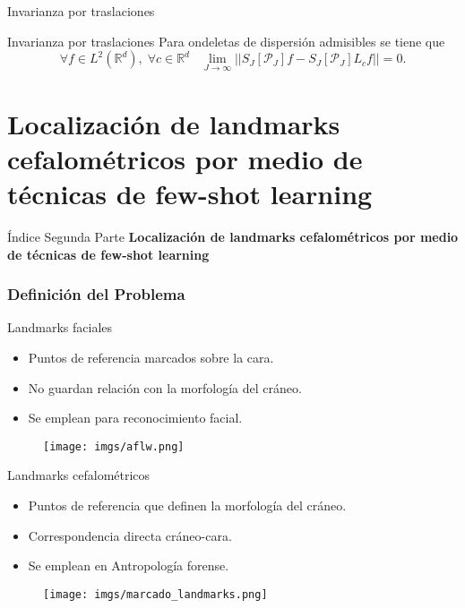 \documentclass[aspectratio=43]{beamer}
\begin{document}
\begin{frame}{Invarianza por traslaciones}
  \begin{alertblock}{Invarianza por traslaciones}
    Para ondeletas de dispersión admisibles se tiene que 
    $$\forall f \in L^2(\mathbb{R}^d), \; \forall c\in \mathbb{R}^d \;\;\; \lim_{J\rightarrow \infty}||S_J[\mathcal{P}_J] f-S_J[\mathcal{P}_J] L_cf||=0.$$
  \end{alertblock}
\end{frame}

\part{Localización de landmarks cefalométricos por medio de técnicas de few-shot learning}

\begin{frame}{Índice Segunda Parte}
  \textcolor{tudCyan}{\textbf{Localización de landmarks cefalométricos por medio de técnicas de few-shot learning}}
  \medskip
  \tableofcontents[part=2]
\end{frame}


\section{Definición del Problema}

\begin{frame}{Landmarks faciales}
  \begin{itemize}
    \item Puntos de referencia marcados sobre la cara.
    \item No guardan relación con la morfología del cráneo.
    \item Se emplean para reconocimiento facial.
  \end{itemize}

  \begin{figure}
    \centering
    \texttt{[image: imgs/aflw.png]}
  \end{figure}

\end{frame}

\begin{frame}{Landmarks cefalométricos}
  \begin{itemize}
    \item Puntos de referencia que definen la morfología del cráneo.
    \item Correspondencia directa cráneo-cara.
    \item Se emplean en Antropología forense.
  \end{itemize}
  \begin{figure}
    \centering
    \texttt{[image: imgs/marcado\_landmarks.png]}
  \end{figure}
\end{frame}
\end{document}
